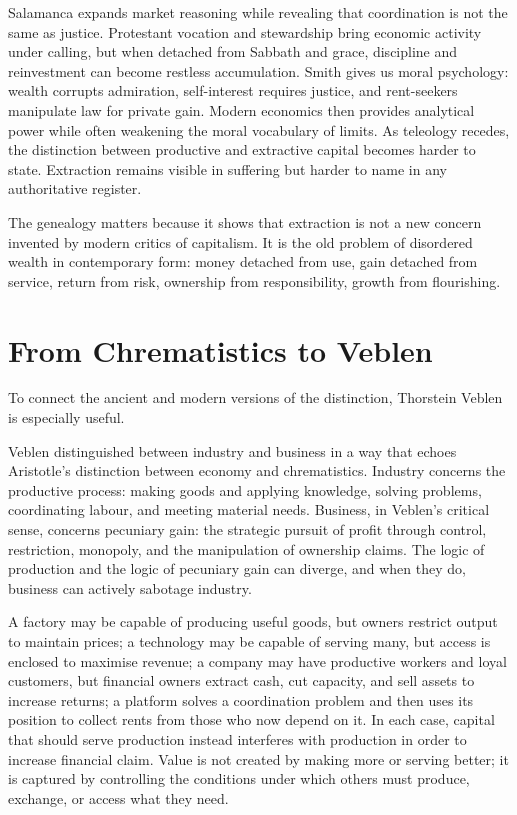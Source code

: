 \documentclass[11pt,a4paper,oneside]{book}
\begin{document}
Salamanca expands market reasoning while revealing that coordination is not the same as justice. Protestant vocation and stewardship bring economic activity under calling, but when detached from Sabbath and grace, discipline and reinvestment can become restless accumulation. Smith gives us moral psychology: wealth corrupts admiration, self-interest requires justice, and rent-seekers manipulate law for private gain. Modern economics then provides analytical power while often weakening the moral vocabulary of limits. As teleology recedes, the distinction between productive and extractive capital becomes harder to state. Extraction remains visible in suffering but harder to name in any authoritative register.

The genealogy matters because it shows that extraction is not a new concern invented by modern critics of capitalism. It is the old problem of disordered wealth in contemporary form: money detached from use, gain detached from service, return from risk, ownership from responsibility, growth from flourishing.

\section*{From Chrematistics to Veblen}

To connect the ancient and modern versions of the distinction, Thorstein Veblen is especially useful.

Veblen distinguished between industry and business in a way that echoes Aristotle's distinction between economy and chrematistics. Industry concerns the productive process: making goods and applying knowledge, solving problems, coordinating labour, and meeting material needs. Business, in Veblen's critical sense, concerns pecuniary gain: the strategic pursuit of profit through control, restriction, monopoly, and the manipulation of ownership claims. The logic of production and the logic of pecuniary gain can diverge, and when they do, business can actively sabotage industry.

A factory may be capable of producing useful goods, but owners restrict output to maintain prices; a technology may be capable of serving many, but access is enclosed to maximise revenue; a company may have productive workers and loyal customers, but financial owners extract cash, cut capacity, and sell assets to increase returns; a platform solves a coordination problem and then uses its position to collect rents from those who now depend on it. In each case, capital that should serve production instead interferes with production in order to increase financial claim. Value is not created by making more or serving better; it is captured by controlling the conditions under which others must produce, exchange, or access what they need.
\end{document}
